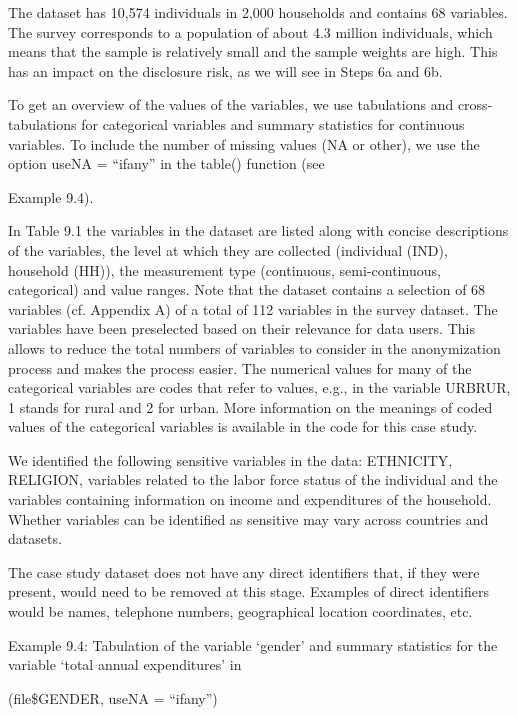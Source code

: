 \documentclass[letterpaper,10pt,english]{sphinxmanual}
\begin{document}
The dataset has 10,574 individuals in 2,000 households and contains 68
variables. The survey corresponds to a population of about 4.3 million
individuals, which means that the sample is relatively small and the
sample weights are high. This has an impact on the disclosure risk, as
we will see in Steps 6a and 6b.

To get an overview of the values of the variables, we use tabulations
and cross-tabulations for categorical variables and summary statistics
for continuous variables. To include the number of missing values (NA or
other), we use the option useNA = “ifany” in the table() function (see

Example 9.4).

In Table 9.1 the variables in the dataset are listed along with concise
descriptions of the variables, the level at which they are collected
(individual (IND), household (HH)), the measurement type (continuous,
semi-continuous, categorical) and value ranges. Note that the dataset
contains a selection of 68 variables (cf. Appendix A) of a total of 112
variables in the survey dataset. The variables have been preselected
based on their relevance for data users. This allows to reduce the total
numbers of variables to consider in the anonymization process and makes
the process easier. The numerical values for many of the categorical
variables are codes that refer to values, e.g., in the variable URBRUR,
1 stands for rural and 2 for urban. More information on the meanings of
coded values of the categorical variables is available in the  code
for this case study.

We identified the following sensitive variables in the data: ETHNICITY,
RELIGION, variables related to the labor force status of the individual
and the variables containing information on income and expenditures of
the household. Whether variables can be identified as sensitive may vary
across countries and datasets.

The case study dataset does not have any direct identifiers that, if
they were present, would need to be removed at this stage. Examples of
direct identifiers would be names, telephone numbers, geographical
location coordinates, etc.

Example 9.4: Tabulation of the variable ‘gender’ and summary statistics
for the variable ‘total annual expenditures’ in 

(file\$GENDER, useNA = “ifany”) 
\end{document}

